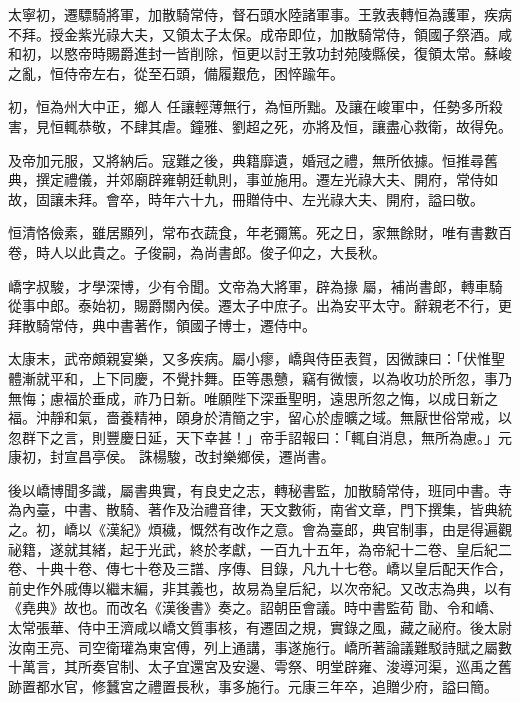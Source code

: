 \begin{pinyinscope}
 太寧初，遷驃騎將軍，加散騎常侍，督石頭水陸諸軍事。王敦表轉恒為護軍，疾病不拜。授金紫光祿大夫，又領太子太保。成帝即位，加散騎常侍，領國子祭酒。咸和初，以愍帝時賜爵進封一皆削除，恒更以討王敦功封苑陵縣侯，復領太常。蘇峻之亂，恒侍帝左右，從至石頭，備履艱危，困悴踰年。



 初，恒為州大中正，鄉人
 任讓輕薄無行，為恒所黜。及讓在峻軍中，任勢多所殺害，見恒輒恭敬，不肆其虐。鐘雅、劉超之死，亦將及恒，讓盡心救衛，故得免。



 及帝加元服，又將納后。寇難之後，典籍靡遺，婚冠之禮，無所依據。恒推尋舊典，撰定禮儀，并郊廟辟雍朝廷軌則，事並施用。遷左光祿大夫、開府，常侍如故，固讓未拜。會卒，時年六十九，冊贈侍中、左光祿大夫、開府，謚曰敬。



 恒清恪儉素，雖居顯列，常布衣蔬食，年老彌篤。死之日，家無餘財，唯有書數百卷，時人以此貴之。子俊嗣，為尚書郎。俊子仰之，大長秋。



 嶠字叔駿，才學深博，少有令聞。文帝為大將軍，辟為掾
 屬，補尚書郎，轉車騎從事中郎。泰始初，賜爵關內侯。遷太子中庶子。出為安平太守。辭親老不行，更拜散騎常侍，典中書著作，領國子博士，遷侍中。



 太康末，武帝頗親宴樂，又多疾病。屬小瘳，嶠與侍臣表賀，因微諫曰：「伏惟聖體漸就平和，上下同慶，不覺抃舞。臣等愚戇，竊有微懷，以為收功於所忽，事乃無悔；慮福於垂成，祚乃日新。唯願陛下深垂聖明，遠思所忽之悔，以成日新之福。沖靜和氣，嗇養精神，頤身於清簡之宇，留心於虛曠之域。無厭世俗常戒，以忽群下之言，則豐慶日延，天下幸甚！」帝手詔報曰：「輒自消息，無所為慮。」元康初，封宣昌亭侯。
 誅楊駿，改封樂鄉侯，遷尚書。



 後以嶠博聞多識，屬書典實，有良史之志，轉秘書監，加散騎常侍，班同中書。寺為內臺，中書、散騎、著作及治禮音律，天文數術，南省文章，門下撰集，皆典統之。初，嶠以《漢紀》煩穢，慨然有改作之意。會為臺郎，典官制事，由是得遍觀祕籍，遂就其緒，起于光武，終於孝獻，一百九十五年，為帝紀十二卷、皇后紀二卷、十典十卷、傳七十卷及三譜、序傳、目錄，凡九十七卷。嶠以皇后配天作合，前史作外戚傳以繼末編，非其義也，故易為皇后紀，以次帝紀。又改志為典，以有《堯典》故也。而改名《漢後書》奏之。詔朝臣會議。時中書監荀
 勖、令和嶠、太常張華、侍中王濟咸以嶠文質事核，有遷固之規，實錄之風，藏之祕府。後太尉汝南王亮、司空衛瓘為東宮傅，列上通講，事遂施行。嶠所著論議難駁詩賦之屬數十萬言，其所奏官制、太子宜還宮及安邊、雩祭、明堂辟雍、浚導河渠，巡禹之舊跡置都水官，修蠶宮之禮置長秋，事多施行。元康三年卒，追贈少府，謚曰簡。




\end{pinyinscope}

